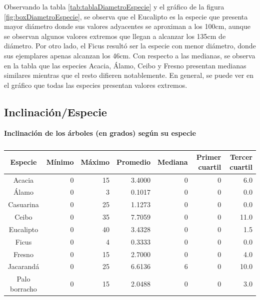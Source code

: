 \documentclass[11pt]{article}
\begin{document}
\begin{justify}
  Observando la tabla \ref{tab:tablaDiametroEspecie} y el gráfico
  de la figura \ref{fig:boxDiametroEspecie}, se observa que el Eucalipto es la
  especie que presenta mayor diámetro donde sus valores adyacentes se
  aproximan a los 100cm, aunque se observan algunos valores extremos que llegan
  a alcanzar los 135cm de diámetro. Por otro lado, el Ficus resultó ser la
  especie con menor diámetro, donde sus ejemplares apenas alcanzan los 46cm.
  Con respecto a las medianas, se observa en la tabla que las especies
  Acacia, Álamo, Ceibo y Fresno presentan medianas similares mientras que el resto
  difieren notablemente.
  En general, se puede ver en el gráfico que todas las especies presentan valores
  extremos.
\end{justify}


\subsection{Inclinación/Especie}

\begin{table}[h!]
  \begin{center}
    \caption*{\textbf{Inclinación de los árboles (en grados) según su especie}}
    \begin{tabular}{| c | r | r | r | r | r | r |}
      \hline
      \textbf{Especie} & \textbf{Mínimo} & \textbf{Máximo} & \textbf{Promedio} &
      \textbf{Mediana} & \textbf{Primer cuartil} & \textbf{Tercer cuartil}  \\ \hline
      Acacia & 0 & 15 & 3.4000 & 0 & 0 & 6.0 \\ \hline
      Álamo & 0 & 3 & 0.1017 & 0 & 0 & 0.0 \\ \hline
      Casuarina & 0 & 25 & 1.1273 & 0 & 0 & 0.0 \\ \hline
      Ceibo & 0 & 35 & 7.7059 & 0 & 0 & 11.0 \\ \hline
      Eucalipto & 0 & 40 & 3.4328 & 0 & 0 & 1.5 \\ \hline
      Ficus & 0 & 4 & 0.3333 & 0 & 0 & 0.0 \\ \hline
      Fresno & 0 & 15 & 2.7000 & 0 & 0 & 4.0 \\ \hline
      Jacarandá & 0 & 25 & 6.6136 & 6 & 0 & 10.0 \\ \hline
      Palo borracho & 0 & 15 & 2.0488 & 0 & 0 & 3.0 \\ \hline
    \end{tabular}
    \caption{}
    \label{tab:tablaInclinacionEspecie}
  \end{center}
\end{table}
\end{document}
